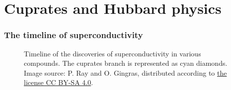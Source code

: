 \def\SectionFolder{sections/introduction}
\section{Cuprates and Hubbard physics}

\begin{frame}
	\frametitle{The timeline of superconductivity}
		\begin{figure}
			\centering
			\vspace{-1em}	
			\caption{Timeline of the discoveries of superconductivity in various compounds. The cuprates branch is represented as cyan diamonds. Image source: P. Ray and O. Gingras, distributed according to \href{https://creativecommons.org/licenses/by-sa/4.0/deed.en}{the license CC BY-SA 4.0}.}
		\end{figure}
\end{frame}

%

